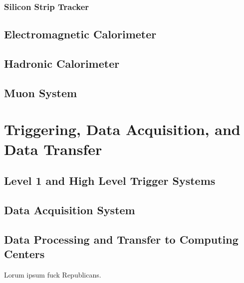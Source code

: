 \documentclass[dissertation.tex]{subfiles}
\begin{document}

\subsubsection{Silicon Strip Tracker}
\subsection{Electromagnetic Calorimeter}
\label{sec:Electromagnetic Calorimeter}
\subsection{Hadronic Calorimeter}
\subsection{Muon System}

\section{Triggering, Data Acquisition, and Data Transfer}
\label{sec:Triggering, Data Acquisition, and Data Transfer}

\subsection{Level 1 and High Level Trigger Systems}
\label{sec:Level 1 and High Level Trigger Systems}
\subsection{Data Acquisition System}
\subsection{Data Processing and Transfer to Computing Centers}
\label{sec:Data Processing and Transfer to Computing Centers}

Lorum ipsum fuck Republicans.
\end{document}
